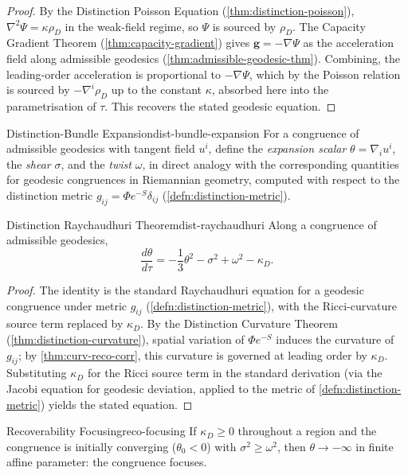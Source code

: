\documentclass[12pt,twoside,openright]{book}
\begin{document}
\begin{proof}
  By the Distinction Poisson Equation
  (\cref{thm:distinction-poisson}), $\nabla^2\Psi =
  \kappa\rho_D$ in the weak-field regime, so
  $\Psi$ is sourced by $\rho_D$. The Capacity Gradient
  Theorem (\cref{thm:capacity-gradient}) gives
  $\mathbf{g} = -\nabla\Psi$ as the acceleration field along
  admissible geodesics (\cref{thm:admissible-geodesic-thm}).
  Combining, the leading-order acceleration is proportional
  to $-\nabla\Psi$, which by the Poisson relation is sourced
  by $-\nabla^i\rho_D$ up to the constant $\kappa$, absorbed
  here into the parametrisation of $\tau$. This recovers the
  stated geodesic equation.
\end{proof}

\begin{definition}{Distinction-Bundle Expansion}{dist-bundle-expansion}
  For a congruence of admissible geodesics with tangent
  field $u^i$, define the \emph{expansion scalar}
  $\theta = \nabla_i u^i$, the \emph{shear} $\sigma$, and the
  \emph{twist} $\omega$, in direct analogy with the
  corresponding quantities for geodesic congruences in
  Riemannian geometry, computed with respect to the
  distinction metric $g_{ij} = \Phi e^{-S}\delta_{ij}$
  (\cref{defn:distinction-metric}).
\end{definition}

\begin{theorem}{Distinction Raychaudhuri Theorem}{dist-raychaudhuri}
  Along a congruence of admissible geodesics,
  \[
    \frac{d\theta}{d\tau}
    = -\frac{1}{3}\theta^2 - \sigma^2 + \omega^2 - \kappa_D.
  \]
\end{theorem}

\begin{proof}
  The identity is the standard Raychaudhuri equation for a
  geodesic congruence under metric $g_{ij}$
  (\cref{defn:distinction-metric}), with the Ricci-curvature
  source term replaced by $\kappa_D$. By the Distinction
  Curvature Theorem (\cref{thm:distinction-curvature}),
  spatial variation of $\Phi e^{-S}$ induces the curvature of
  $g_{ij}$; by \cref{thm:curv-reco-corr}, this curvature is
  governed at leading order by $\kappa_D$. Substituting
  $\kappa_D$ for the Ricci source term in the standard
  derivation (via the Jacobi equation for geodesic
  deviation, applied to the metric of
  \cref{defn:distinction-metric}) yields the stated
  equation.
\end{proof}

\begin{corollary}{Recoverability Focusing}{reco-focusing}
  If $\kappa_D \ge 0$ throughout a region and the congruence
  is initially converging ($\theta_0 < 0$) with
  $\sigma^2 \ge \omega^2$, then $\theta \to -\infty$ in
  finite affine parameter: the congruence focuses.
\end{corollary}
\end{document}
